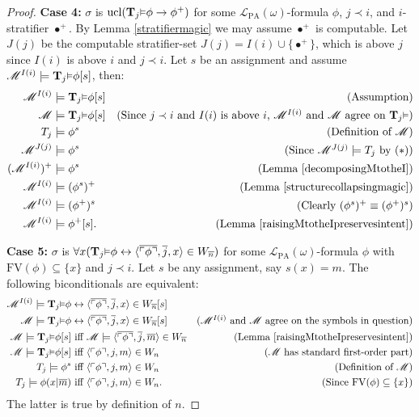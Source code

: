 \documentclass[reqno]{article}
\theoremstyle{definition}
\def\L{\mathscr{L}}
\def\M{\mathscr{M}}
\def\T{\mathbf{T}}
\def\FV{\mathrm{FV}}
\def\LPA{\L_{\mathrm{PA}}}
\renewcommand{\Pr}[1]{\T_{#1}\mbox{\small${\vDash}$}}
\newcommand{\ucl}[1]{\mathrm{ucl}(#1)}
\newcommand{\case}[1]{\textbf{Case #1:}}
\begin{document}
\begin{proof}
\item
\case4
$\sigma$ is $\ucl{\Pr j\phi\rightarrow\phi^+}$ for some $\LPA(\omega)$-formula $\phi$, $j\prec i$,
and $i$-stratifier $\bullet^+$.
By Lemma \ref{stratifiermagic} we may assume $\bullet^+$ is computable.
Let $J(j)$ be the computable stratifier-set $J(j)=I(i)\cup\{\bullet^+\}$, which is above $j$
since $I(i)$ is above $i$ and $j\prec i$.
Let $s$ be an assignment and assume $\M^{I(i)}\models \Pr j\phi[s]$, then:
\begin{align*}
\M^{I(i)} &\models \Pr j\phi[s]
  &\mbox{(Assumption)}\\
\M &\models \Pr j\phi[s]
  &\mbox{(Since $j\prec i$ and $I(i)$ is above $i$, $\M^{I(i)}$ and $\M$ agree
  on $\Pr j$)}\\
T_j &\models \phi^s
  &\mbox{(Definition of $\M$)}\\
\M^{J(j)} &\models \phi^s
  &\mbox{(Since $\M^{J(j)}\models T_j$ by ($*$))}\\
(\M^{I(i)})^+ &\models \phi^s
  &\mbox{(Lemma \ref{decomposingMtotheI})}\\
\M^{I(i)} &\models (\phi^s)^+
  &\mbox{(Lemma \ref{structurecollapsingmagic})}\\
\M^{I(i)} &\models (\phi^+)^s
  &\mbox{(Clearly $(\phi^s)^+\equiv(\phi^+)^s$)}\\
\M^{I(i)} &\models \phi^+[s].
  &\mbox{(Lemma \ref{raisingMtotheIpreservesintent})}
\end{align*}

\item
\case5
$\sigma$ is
$\forall x(\Pr j\phi\leftrightarrow\langle\overline{\ulcorner\phi\urcorner},\overline j,
x\rangle\in W_{\overline n})$
for some $\LPA(\omega)$-formula $\phi$ with $\FV(\phi)\subseteq\{x\}$
and $j\prec i$.
Let $s$ be any assignment, say $s(x)=m$.
The following biconditionals are equivalent:
\begin{align*}
\M^{I(i)} \models \Pr j\phi&\leftrightarrow
\langle\overline{\ulcorner\phi\urcorner}, \overline j,x\rangle\in W_{\overline n}[s]\\
\M \models \Pr j\phi&\leftrightarrow
\langle\overline{\ulcorner\phi\urcorner}, \overline j,x\rangle\in W_{\overline n}[s]
  &\mbox{($\M^{I(i)}$ and $\M$ agree on the symbols in question)}\\
\M \models \Pr j\phi[s]&\mbox{ iff }\M\models
\langle\overline{\ulcorner\phi\urcorner}, \overline j,\overline m\rangle\in W_{\overline n}
  &\mbox{(Lemma \ref{raisingMtotheIpreservesintent})}\\
\M \models \Pr j\phi[s]&\mbox{ iff }
\langle\ulcorner\phi\urcorner,j,m\rangle\in W_n
  &\mbox{($\M$ has standard first-order part)}\\
T_j \models \phi^s&\mbox{ iff }
\langle\ulcorner\phi\urcorner,j,m\rangle\in W_n
  &\mbox{(Definition of $\M$)}\\
T_j \models \phi(x|\overline m)&\mbox{ iff }
\langle\ulcorner\phi\urcorner,j,m\rangle\in W_n.
  &\mbox{(Since $\FV(\phi)\subseteq\{x\}$)}
\end{align*}
The latter is true by definition of $n$.


\end{proof}
\end{document}
